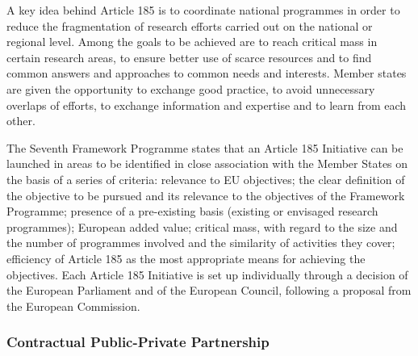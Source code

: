 \documentclass[10pt, plain]{../../metanetpaper}
\begin{document}
\begin{multicols}{2}
A key idea behind Article 185 is to coordinate national programmes in order to reduce the fragmentation of research efforts carried out on the national or regional level. Among the goals to be achieved are to reach critical mass in certain research areas, to ensure better use of scarce resources and to find common answers and approaches to common needs and interests. Member states are given the opportunity to exchange good practice, to avoid unnecessary overlaps of efforts, to exchange information and expertise and to learn from each other.

The Seventh Framework Programme states that an Article 185 Initiative can be launched in areas to be identified in close association with the Member States on the basis of a series of criteria: relevance to EU objectives; the clear definition of the objective to be pursued and its relevance to the objectives of the Framework Programme; presence of a pre-existing basis (existing or envisaged research programmes); European added value; critical mass, with regard to the size and the number of programmes involved and the similarity of activities they cover; efficiency of Article 185 as the most appropriate means for achieving the objectives. Each Article 185 Initiative is set up individually through a decision of the European Parliament and of the European Council, following a proposal from the European Commission.


\subsubsection{Contractual Public-Private Partnership}
\label{sec:contr-ppp}


\end{multicols}
\end{document}
